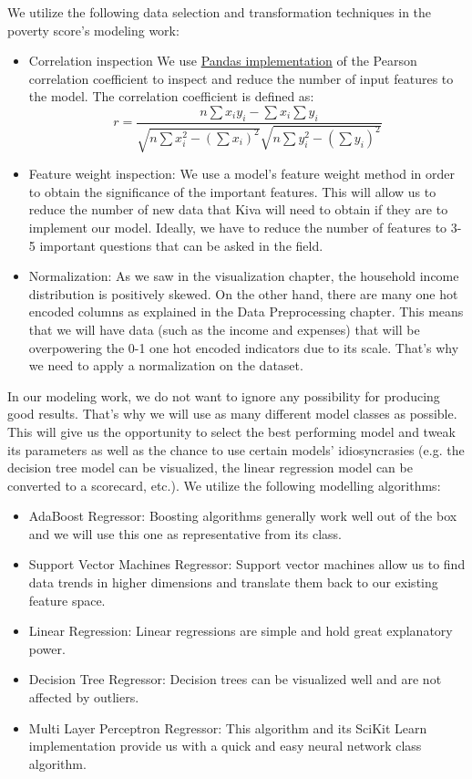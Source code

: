 \documentclass{article}
\begin{document}
We utilize the following data selection and transformation techniques in the poverty score’s modeling work:
\begin{itemize}
  \item Correlation inspection We use \href{http://pandas.pydata.org/pandas-docs/version/0.17.0/generated/pandas.DataFrame.corr.html}{Pandas implementation} of the Pearson correlation coefficient to inspect and reduce the number of input features to the model. The correlation coefficient is defined as:
    \begin{equation}
      r = \frac{n \sum x_i y_i - \sum x_i \sum y_i}{\sqrt{n \sum x_i^2 - (\sum x_i)^2} \sqrt{n \sum y_i^2 - (\sum y_i)^2}}
    \end{equation}
  \item Feature weight inspection: We use a model’s feature weight method in order to obtain the significance of the important features. This will allow us to reduce the number of new data that Kiva will need to obtain if they are to implement our model. Ideally, we have to reduce the number of features to 3-5 important questions that can be asked in the field.
  \item Normalization: As we saw in the visualization chapter, the household income distribution is positively skewed. On the other hand, there are many one hot encoded columns as explained in the Data Preprocessing chapter. This means that we will have data (such as the income and expenses) that will be overpowering the 0-1 one hot encoded indicators due to its scale. That’s why we need to apply a normalization on the dataset.
\end{itemize}

In our modeling work, we do not want to ignore any possibility for producing good results. That’s why we will use as many different model classes as possible. This will give us the opportunity to select the best performing model and tweak its parameters as well as the chance to use certain models’ idiosyncrasies (e.g. the decision tree model can be visualized, the linear regression model can be converted to a scorecard, etc.).  We utilize the following modelling algorithms:
\begin{itemize}
  \item AdaBoost Regressor: Boosting algorithms generally work well out of the box and we will use this one as representative from its class.
  \item Support Vector Machines Regressor: Support vector machines allow us to find data trends in higher dimensions and translate them back to our existing feature space.
  \item Linear Regression: Linear regressions are simple and hold great explanatory power.
  \item Decision Tree Regressor: Decision trees can be visualized well and are not affected by outliers.
  \item Multi Layer Perceptron Regressor: This algorithm and its SciKit Learn implementation provide us with a quick and easy neural network class algorithm.
\end{itemize}
\end{document}

